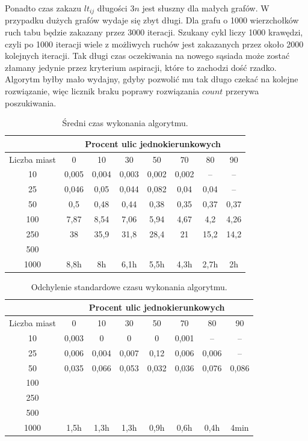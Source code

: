 \documentclass[11pt,a4paper,twoside]{article}
\begin{document}
Ponadto czas zakazu $lt_{ij}$ długości $3n$ jest słuszny dla małych grafów. W przypadku dużych grafów wydaje się zbyt długi. Dla grafu o 1000 wierzchołków ruch tabu będzie zakazany przez 3000 iteracji. Szukany cykl liczy 1000 krawędzi, czyli po 1000 iteracji wiele z możliwych ruchów jest zakazanych przez około 2000 kolejnych iteracji. Tak długi czas oczekiwania na nowego sąsiada może zostać złamany jedynie przez kryterium aspiracji, które to zachodzi dość rzadko. Algorytm byłby mało wydajny, gdyby pozwolić mu tak długo czekać na kolejne rozwiązanie, więc licznik braku poprawy rozwiązania $count$ przerywa poszukiwania.

\bgroup
\def\arraystretch{1.2}
\begin{table}[ht]
\centering
\begin{tabular}{|c|c|c|c|c|c|c|c|}
\hline
 & \multicolumn{7}{c|}{Procent ulic jednokierunkowych}\\\hline
Liczba miast & 0 & 10 & 30 & 50 & 70& 80& 90\\  \hline
10& 0,005& 0,004& 0,003& 0,002& 0,002& --& --\\ \hline
25& 0,046& 0,05& 0,044& 0,082& 0,04& 0,04& --\\ \hline
50& 0,5& 0,48& 0,44& 0,38& 0,35& 0,37& 0,37\\ \hline
100& 7,87& 8,54& 7,06& 5,94& 4,67& 4,2& 4,26\\ \hline
250& 38& 35,9&31,8& 28,4& 21& 15,2& 14,2 \\ \hline
500& & & & & & & \\ \hline
1000& 8,8h& 8h& 6,1h& 5,5h& 4,3h& 2,7h& 2h\\ \hline
\end{tabular}
\caption{Średni czas wykonania algorytmu.}
\label{czasWykonania}
\end{table}
\egroup


\bgroup
\def\arraystretch{1.2}
\begin{table}[ht]
\centering
\begin{tabular}{|c|c|c|c|c|c|c|c|}
\hline
 & \multicolumn{7}{c|}{Procent ulic jednokierunkowych}\\\hline
Liczba miast & 0 & 10 & 30 & 50 & 70& 80& 90\\  \hline
10& 0,003& 0& 0& 0& 0,001& --& --\\ \hline
25& 0,006& 0,004& 0,007& 0,12& 0,006& 0,006& --\\ \hline
50& 0,035& 0,066& 0,053& 0,032& 0,036& 0,076& 0,086\\ \hline
100& & & & & & & \\ \hline
250& & & & & & & \\ \hline
500& & & & & & & \\ \hline
1000& 1,5h& 1,3h& 1,3h& 0,9h& 0,6h& 0,4h& 4min\\ \hline
\end{tabular}
\caption{Odchylenie standardowe czasu wykonania algorytmu.}
\label{odchylenieCzasuWykonania}
\end{table}
\egroup
\end{document}
